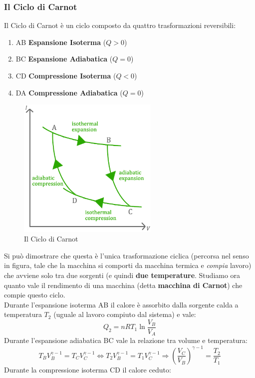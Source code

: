 \documentclass{article}
\newcommand{\then}{\ensuremath{\Rightarrow}}
\begin{document}
\subsubsection{Il Ciclo di Carnot}
Il Ciclo di Carnot è un ciclo composto da quattro trasformazioni reversibili:
\begin{enumerate}
    \item AB \textbf{Espansione Isoterma} ($Q>0$)
    \item BC \textbf{Espansione Adiabatica} ($Q=0$)
    \item CD \textbf{Compressione Isoterma} ($Q<0$)
    \item DA \textbf{Compressione Adiabatica} ($Q=0$)
\end{enumerate}
\begin{figure}[H]
    \centering
    \includegraphics[width=0.6\textwidth]{CicloCarnot.png}
    \caption{Il Ciclo di Carnot}
    \label{CicloCarnot}
\end{figure}
Si può dimostrare che questa è l'unica trasformazione ciclica (percorsa nel senso in figura, tale che la macchina si comporti da macchina termica e \textit{compia} lavoro) che avviene solo tra due sorgenti (e quindi \textbf{due temperature}. Studiamo ora quanto vale il rendimento di una macchina (detta \textbf{macchina di Carnot}) che compie questo ciclo. \\
Durante l'espansione isoterma AB il calore è assorbito dalla sorgente calda a temperatura $T_2$ (uguale al lavoro compiuto dal sistema) e vale:
\[Q_2=nRT_1\ln\frac{V_B}{V_A}\]
Durante l'espansione adiabatica BC vale la relazione tra volume e temperatura:
\[T_BV_B^{\gamma-1}=T_CV_C^{\gamma-1}\iff T_2V_B^{\gamma-1}=T_1V_C^{\gamma-1}\then \left(\frac{V_C}{V_B}\right)^{\gamma-1}=\frac{T_2}{T_1}\]
Durante la compressione isoterma CD il calore ceduto:
\end{document}
